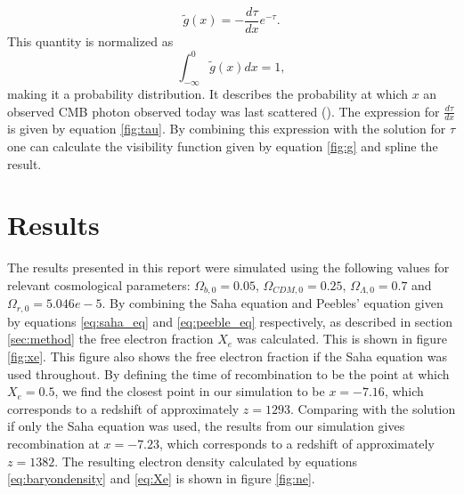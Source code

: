 \documentclass[onecolumn]{aastex62}
\begin{document}
\begin{equation}\label{eq:visibility}
    \widetilde{g}(x)=-\frac{d\tau}{dx}e^{-\tau}.
\end{equation}
This quantity is normalized as
\begin{equation}
    \int_{-\infty}^{0} \tilde{g}(x)dx = 1,
\end{equation}
making it a probability distribution. It describes the probability at which $x$ an observed CMB photon observed today was last scattered (\cite{callin2006calculate}). The expression for $\frac{d\tau}{dx}$ is given by equation \ref{fig:tau}. By combining this expression with the solution for $\tau$ one can calculate the visibility function given by equation \ref{fig:g} and spline the result.
\section{Results}
\label{sec:results}
The results presented in this report were simulated using the following values for relevant cosmological parameters: $\Omega_{b,0}=0.05$, $\Omega_{CDM,0}=0.25$, $\Omega_{\Lambda,0}=0.7$ and $\Omega_{r,0}=5.046e-5$. By combining the Saha equation and Peebles' equation given by equations \ref{eq:saha_eq} and \ref{eq:peeble_eq} respectively, as described in section \ref{sec:method} the free electron fraction $X_e$ was calculated. This is shown in figure \ref{fig:xe}. This figure also shows the free electron fraction if the Saha equation was used throughout. By defining the time of recombination to be the point at which $X_e=0.5$, we find the closest point in our simulation to be $x=-7.16$, which corresponds to a redshift of approximately $z=1293$. Comparing with the solution if only the Saha equation was used, the results from our simulation gives recombination at $x=-7.23$, which corresponds to a redshift of approximately $z=1382$. The resulting electron density calculated by equations \ref{eq:baryondensity} and \ref{eq:Xe} is shown in figure \ref{fig:ne}. 
\end{document}
